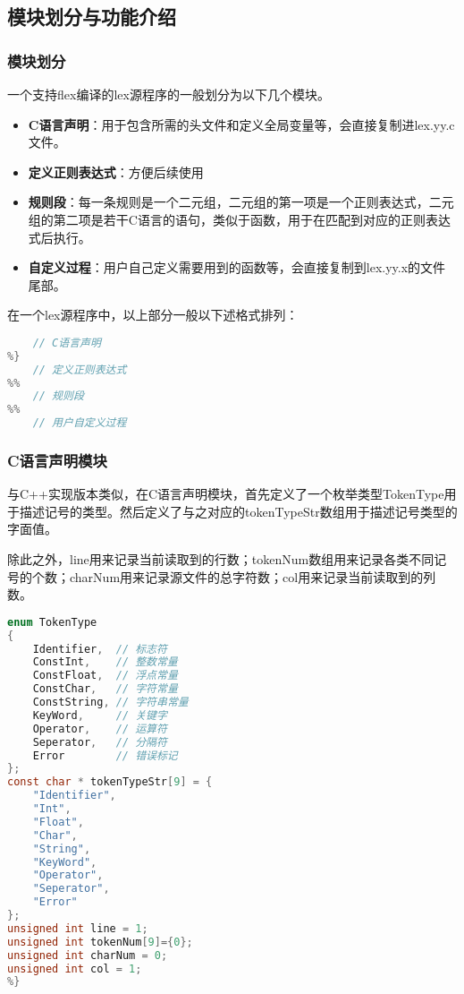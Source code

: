 \documentclass[twocolumn]{article}
\begin{document}
\subsection{模块划分与功能介绍}
\subsubsection{模块划分}
一个支持flex编译的lex源程序的一般划分为以下几个模块。
\begin{itemize}
	\item \textbf{C语言声明}：用于包含所需的头文件和定义全局变量等，会直接复制进lex.yy.c文件。
	\item \textbf{定义正则表达式}：方便后续使用
	\item \textbf{规则段}：每一条规则是一个二元组，二元组的第一项是一个正则表达式，二元组的第二项是若干C语言的语句，类似于函数，用于在匹配到对应的正则表达式后执行。
	\item \textbf{自定义过程}：用户自己定义需要用到的函数等，会直接复制到lex.yy.x的文件尾部。
\end{itemize}
在一个lex源程序中，以上部分一般以下述格式排列：
\begin{lstlisting}[language=C]
%{
	// C语言声明
%}
	// 定义正则表达式
%%
	// 规则段
%%
	// 用户自定义过程
\end{lstlisting}

\subsubsection{C语言声明模块}

与C++实现版本类似，在C语言声明模块，首先定义了一个枚举类型TokenType用于描述记号的类型。然后定义了与之对应的tokenTypeStr数组用于描述记号类型的字面值。

除此之外，line用来记录当前读取到的行数；tokenNum数组用来记录各类不同记号的个数；charNum用来记录源文件的总字符数；col用来记录当前读取到的列数。

\begin{lstlisting}[language=C]
%{
enum TokenType
{
    Identifier,  // 标志符
    ConstInt,    // 整数常量
    ConstFloat,  // 浮点常量
    ConstChar,   // 字符常量
    ConstString, // 字符串常量
    KeyWord,     // 关键字
    Operator,    // 运算符
    Seperator,   // 分隔符
    Error        // 错误标记
};
const char * tokenTypeStr[9] = {
    "Identifier",
    "Int",
    "Float",
    "Char",
    "String",
    "KeyWord",
    "Operator",
    "Seperator",
    "Error"
};
unsigned int line = 1;
unsigned int tokenNum[9]={0};
unsigned int charNum = 0;
unsigned int col = 1;
%}
\end{lstlisting}
\end{document}
